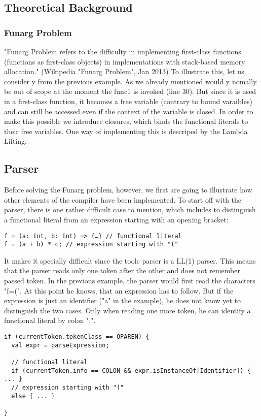 \subsection{Theoretical Background}

\subsubsection{Funarg Problem}
"Funarg Problem refers to the difficulty in implementing first-class functions (functions as first-class objects) in implementations with stack-based memory allocation." (Wikipedia "Funarg Problem", Jan 2013) To illustrate this, let us consider y from the previous example. As we already mentioned would y nomally be out of scope at the moment the func1 is invoked (line 30). But since it is used in a first-class function, it becomes a free variable (contrary to bound varaibles) and can still be accessed even if the context of the variable is closed. In order to make this possible we introduce closures, which binds the functional literals to their free variables. One way of implementing this is descriped by the Lambda Lifting. \newline

\subsection{Parser}
Before solving the Funarg problem, however, we first are going to illustrate how other elements of the compiler have been implemented. To start off with the parser, there is one rather difficult case to mention, which includes to distinguish a functional literal from an expression starting with an opening bracket:
\begin{lstlisting}
f = (a: Int, b: Int) => {…} // functional literal
f = (a + b) * c; // expression starting with "("
\end{lstlisting}
It makes it specially difficult since the toolc parser is a LL(1) parser. This means that the parser reads only one token after the other and does not remember passed token. In the previous example, the parser would first read the characters "f=(". At this point he knows, that an expression has to follow. But if the expression is just an identifier ("a" in the example), he does not know yet to distinguish the two cases. Only when reading one more token, he can identify a functional literal by colon ":".
\begin{lstlisting}
if (currentToken.tokenClass == OPAREN) {
  val expr = parseExpression;

  // functional literal
  if (currentToken.info == COLON && expr.isInstanceOf[Identifier]) { ... }
  // expression starting with "("
  else { ... }

}
\end{lstlisting}

